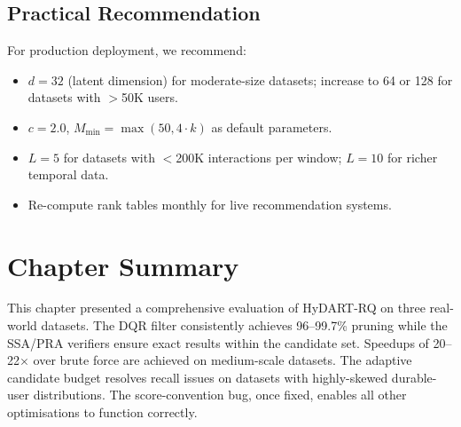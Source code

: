 \subsection{Practical Recommendation}

For production deployment, we recommend:
\begin{itemize}
  \item $d = 32$ (latent dimension) for moderate-size datasets; increase to 64 or 128 for datasets with $>$50K users.
  \item $c = 2.0$, $M_{\min} = \max(50, 4 \cdot k)$ as default parameters.
  \item $L = 5$ for datasets with $<$200K interactions per window; $L = 10$ for richer temporal data.
  \item Re-compute rank tables monthly for live recommendation systems.
\end{itemize}

\section{Chapter Summary}

This chapter presented a comprehensive evaluation of HyDART-RQ on three real-world datasets. The DQR filter consistently achieves 96--99.7\% pruning while the SSA/PRA verifiers ensure exact results within the candidate set. Speedups of 20--22$\times$ over brute force are achieved on medium-scale datasets. The adaptive candidate budget resolves recall issues on datasets with highly-skewed durable-user distributions. The score-convention bug, once fixed, enables all other optimisations to function correctly.
